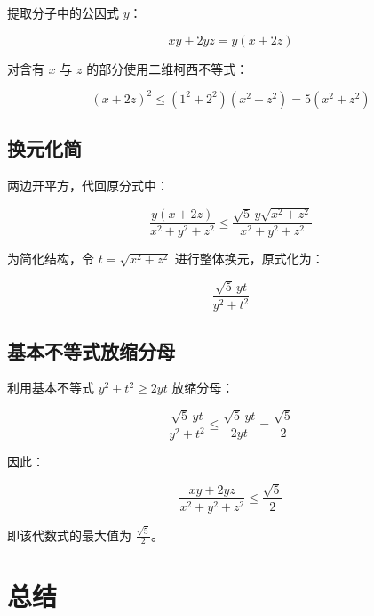 \documentclass[11pt,a4paper]{ctexart}
\begin{document}
提取分子中的公因式 $y$：

\[
xy + 2yz = y(x + 2z)
\]

对含有 $x$ 与 $z$ 的部分使用二维柯西不等式：

\[
(x + 2z)^2 \le (1^2 + 2^2)(x^2 + z^2) = 5(x^2 + z^2)
\]

\subsection*{换元化简}

两边开平方，代回原分式中：

\[
\frac{y(x + 2z)}{x^2 + y^2 + z^2}
\le \frac{\sqrt{5}\,y\sqrt{x^2 + z^2}}{x^2 + y^2 + z^2}
\]

为简化结构，令 $t = \sqrt{x^2 + z^2}$ 进行整体换元，原式化为：

\[
\frac{\sqrt{5}\,yt}{y^2 + t^2}
\]

\subsection*{基本不等式放缩分母}

利用基本不等式 $y^2 + t^2 \ge 2yt$ 放缩分母：

\[
\frac{\sqrt{5}\,yt}{y^2 + t^2}
\le \frac{\sqrt{5}\,yt}{2yt}
= \frac{\sqrt{5}}{2}
\]

因此：

\[
\boxed{\frac{xy + 2yz}{x^2 + y^2 + z^2} \le \frac{\sqrt{5}}{2}}
\]

即该代数式的最大值为 $\displaystyle \frac{\sqrt{5}}{2}$。

\section{总结}
\end{document}
